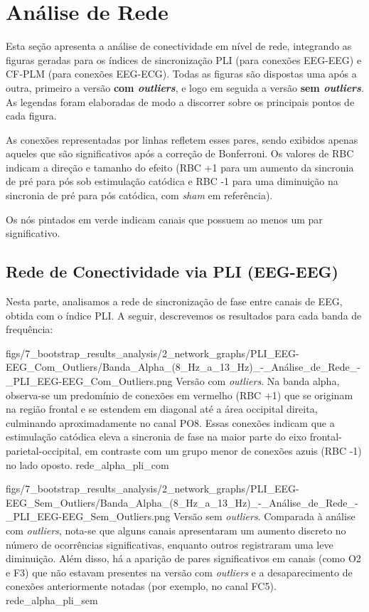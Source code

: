 \chapter{Análise de Rede}
\label{chap:analise_de_rede}
Esta seção apresenta a análise de conectividade em nível de rede, integrando as figuras geradas para os índices de sincronização PLI (para conexões EEG-EEG) e CF‐PLM (para conexões EEG-ECG). Todas as figuras são dispostas uma após a outra, primeiro a versão \textbf{com \textit{outliers}}, e logo em seguida a versão \textbf{sem \textit{outliers}}. As legendas foram elaboradas de modo a discorrer sobre os principais pontos de cada figura. 

As conexões representadas por linhas refletem esses pares, sendo exibidos apenas aqueles que são significativos após a correção de Bonferroni. Os valores de RBC indicam a direção e tamanho do efeito (RBC +1 para um aumento da sincronia de pré para pós sob estimulação catódica e RBC -1 para uma diminuição na sincronia de pré para pós catódica, com \textit{sham} em referência).

Os nós pintados em verde indicam canais que possuem ao menos um par significativo.

\section{Rede de Conectividade via PLI (EEG-EEG)}
Nesta parte, analisamos a rede de sincronização de fase entre canais de EEG, obtida com o índice PLI.  A seguir, descrevemos os resultados para cada banda de frequência:

\smallfigure
{figs/7_bootstrap_results_analysis/2_network_graphs/PLI_EEG-EEG_Com_Outliers/Banda_Alpha_(8_Hz_a_13_Hz)_-_Análise_de_Rede_-_PLI_EEG-EEG_Com_Outliers.png}
{Versão com \textit{outliers}. Na banda alpha, observa-se um predomínio de conexões em vermelho (RBC +1) que se originam na região frontal e se estendem em diagonal até a área occipital direita, culminando aproximadamente no canal PO8. Essas conexões indicam que a estimulação catódica eleva a sincronia de fase na maior parte do eixo frontal-parietal-occipital, em contraste com um grupo menor de conexões azuis (RBC -1) no lado oposto.}
{rede_alpha_pli_com}

\smallfigure
{figs/7_bootstrap_results_analysis/2_network_graphs/PLI_EEG-EEG_Sem_Outliers/Banda_Alpha_(8_Hz_a_13_Hz)_-_Análise_de_Rede_-_PLI_EEG-EEG_Sem_Outliers.png}
{Versão sem \textit{outliers}. Comparada à análise com \textit{outliers}, nota-se que alguns canais apresentaram um aumento discreto no número de ocorrências significativas, enquanto outros registraram uma leve diminuição. Além disso, há a aparição de pares significativos em canais (como O2 e F3) que não estavam presentes na versão com \textit{outliers} e a desaparecimento de conexões anteriormente notadas (por exemplo, no canal FC5).}
{rede_alpha_pli_sem}

